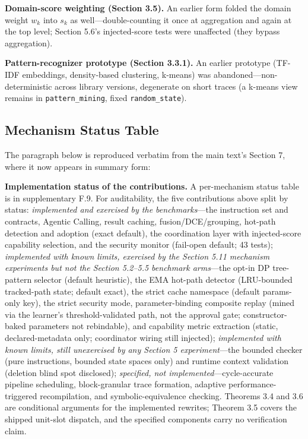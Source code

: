 \documentclass[
  11pt,
]{article}
\begin{document}
\textbf{Domain-score weighting (Section 3.5).} An earlier form folded
the domain weight \(w_k\) into \(s_k\) as well---double-counting it once
at aggregation and again at the top level; Section 5.6's injected-score
tests were unaffected (they bypass aggregation).

\textbf{Pattern-recognizer prototype (Section 3.3.1).} An earlier
prototype (TF-IDF embeddings, density-based clustering, k-means) was
abandoned---non-deterministic across library versions, degenerate on
short traces (a k-means view remains in \texttt{pattern\_mining}, fixed
\texttt{random\_state}).

\subsection{Mechanism Status Table}\label{mechanism-status-table}

The paragraph below is reproduced verbatim from the main text's Section
7, where it now appears in summary form:

\textbf{Implementation status of the contributions.} A per-mechanism
status table is in supplementary F.9. For auditability, the five
contributions above split by status: \emph{implemented and exercised by
the benchmarks}---the instruction set and contracts, Agentic Calling,
result caching, fusion/DCE/grouping, hot-path detection and adoption
(exact default), the coordination layer with injected-score capability
selection, and the security monitor (fail-open default; 43 tests);
\emph{implemented with known limits, exercised by the Section 5.11
mechanism experiments but not the Section 5.2--5.5 benchmark arms}---the
opt-in DP tree-pattern selector (default heuristic), the EMA hot-path
detector (LRU-bounded tracked-path state; default exact), the strict
cache namespace (default params-only key), the strict security mode,
parameter-binding composite replay (mined via the learner's
threshold-validated path, not the approval gate; constructor-baked
parameters not rebindable), and capability metric extraction (static,
declared-metadata only; coordinator wiring still injected);
\emph{implemented with known limits, still unexercised by any Section 5
experiment}---the bounded checker (pure instructions, bounded state
spaces only) and runtime context validation (deletion blind spot
disclosed); \emph{specified, not implemented}---cycle-accurate pipeline
scheduling, block-granular trace formation, adaptive
performance-triggered recompilation, and symbolic-equivalence checking.
Theorems 3.4 and 3.6 are conditional arguments for the implemented
rewrites; Theorem 3.5 covers the shipped unit-slot dispatch, and the
specified components carry no verification claim.
\end{document}
